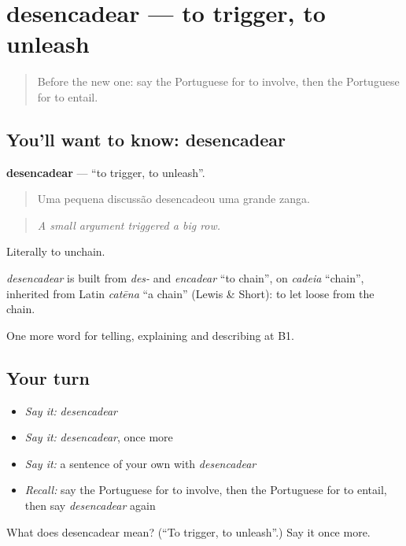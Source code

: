\section[desencadear]{desencadear — to trigger, to unleash}

\label{lesson:PT-C351-desencadear}



\begin{quote}
Before the new one: say the Portuguese for to involve, then the Portuguese for to entail.
\end{quote}

\subsection*{You'll want to know: desencadear}
\textbf{desencadear} — \textquotedblleft{}to trigger, to unleash\textquotedblright{}.

\begin{quote}
Uma pequena discussão desencadeou uma grande zanga.
\end{quote}

\begin{quote}
\emph{A small argument triggered a big row.}
\end{quote}

Literally to unchain.

\begin{cousinweb}
\emph{desencadear} is built from \emph{des-} and \emph{encadear} \textquotedblleft{}to chain\textquotedblright{}, on \emph{cadeia} \textquotedblleft{}chain\textquotedblright{}, inherited from Latin \emph{catēna} \textquotedblleft{}a chain\textquotedblright{} (Lewis \& Short): to let loose from the chain.
\end{cousinweb}

\begin{grammarlens}[title={What you've built}]
One more word for telling, explaining and describing at B1.
\end{grammarlens}

\subsection*{Your turn}
\begin{itemize}
\raggedright
  \item \emph{Say it:} \emph{desencadear}
  \item \emph{Say it:} \emph{desencadear}, once more
  \item \emph{Say it:} a sentence of your own with \emph{desencadear}
  \item \emph{Recall:} say the Portuguese for to involve, then the Portuguese for to entail, then say \emph{desencadear} again
\end{itemize}

\begin{tcolorbox}[breakable,colback=teal!4,colframe=teal!35!black,title={Before you move on}]
What does desencadear mean? (\textquotedblleft{}To trigger, to unleash\textquotedblright{}.) Say it once more.
\end{tcolorbox}
